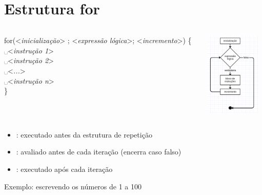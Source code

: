 \documentclass[portuguese,10pt,xcolor=table]{bredelebeamer}
\def\exp[#1]{\color{gray}<\textit{#1}>\color{black}}
\def\espaco{\color{gray}\hspace{0.2cm}\color{black}}
\def\espaco{\color{blue}␣\color{black}}
\begin{document}
\section{Estrutura for}

	\begin{frame}[c]
		\begin{center}
		\end{center}
	\end{frame} 
	
	\begin{frame}
		\begin{columns}[t]
			\begin{column}[T]{.8\textwidth}
				for(\exp[inicialização] ; \exp[expressão lógica]; \exp[incremento]) \{\\
				\espaco \exp[instrução 1]\\
				\espaco \exp[instrução 2]\\
				\espaco \exp[...]\\
				\espaco \exp[instrução n]\\
				\}
			\end{column}
							\begin{column}[T]{.2\textwidth}
								\includegraphics[height=4.0cm]{fluxogramaFor.png}
							\end{column}
		\end{columns}
		\begin{itemize}
			\item {}: executado antes da estrutura de repetição
			\item {}: avaliado antes de cada iteração (encerra caso falso)
			\item {}: executado após cada iteração
		\end{itemize}
	\end{frame}

	\begin{frame}
	    Exemplo: escrevendo os números de 1 a 100
			
		
	\end{frame}
\end{document}
